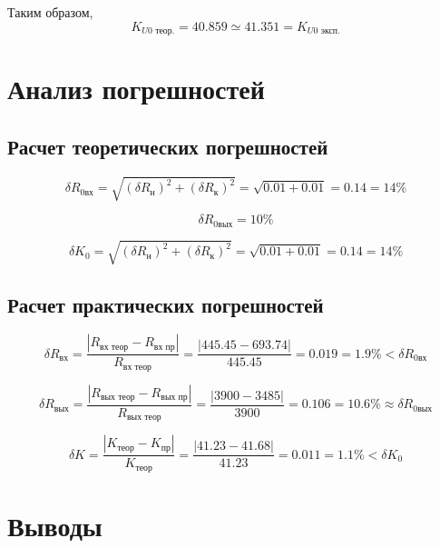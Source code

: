Таким образом, 
\begin{equation*}
K_{U0\text{ теор.}} = 40.859 \simeq 41.351 = K_{U0\text{ эксп.}}
\end{equation*}

\section{Анализ погрешностей}

\subsection{Расчет теоретических погрешностей}

\begin{equation*}
\delta R_\text{0вх} = \sqrt{(\delta R_\text{н})^2 + (\delta R_\text{к})^2} = \sqrt{0.01 + 0.01} = 0.14 = 14 \%
\end{equation*}

\begin{equation*}
\delta R_\text{0вых} = 10\%
\end{equation*}

\begin{equation*}
\delta K_0 = \sqrt{(\delta R_\text{н})^2 + (\delta R_\text{к})^2} = \sqrt{0.01 + 0.01} = 0.14 = 14 \%
\end{equation*}

\subsection{Расчет практических погрешностей}
\begin{equation*}
\delta R_\text{вх} = \frac{|R_\text{вх теор} - R_\text{вх пр}|}{R_\text{вх теор}} = \frac{|445.45 - 693.74|}{445.45} = 0.019 = 1.9 \% < \delta R_\text{0вх}
\end{equation*}

\begin{equation*}
\delta R_\text{вых} = \frac{|R_\text{вых теор} - R_\text{вых пр}|}{R_\text{вых теор}} = \frac{|3900 - 3485|}{3900} = 0.106 = 10.6 \% \approx \delta R_\text{0вых}
\end{equation*}

\begin{equation*}
\delta K = \frac{|K_\text{теор} - K_\text{пр}|}{K_\text{теор}} = \frac{|41.23 - 41.68|}{41.23} = 0.011 = 1.1 \% < \delta K_0
\end{equation*}

\section{Выводы}


